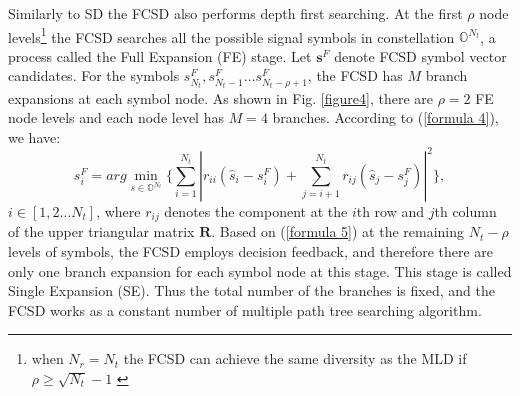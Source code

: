\documentclass[letterpaper, 10pt, conference,twoside]{ieeeconf}
\begin{document}
Similarly to SD the FCSD also performs depth first searching. At the first $\rho$ node levels\footnote{when $N_{r}=N_{t}$ the FCSD can achieve the same diversity as the MLD if $\rho\geq \sqrt{N_{t}}-1$ \cite{barbero2008fixing}} the FCSD searches all the possible signal symbols in constellation $\mathbb{O}^{N_{t}}$, a process called the Full Expansion (FE) stage. Let $\mathbf{s}^{F}$ denote FCSD symbol vector candidates. For the symbols $s^{F}_{N_{t}}, s^{F}_{N_{t}-1}\dots s^{F}_{N_{t}-\rho+1}$, the FCSD has $M$ branch expansions at each symbol node. As shown in Fig. \ref{figure4}, there are $\rho=2$ FE node levels and each node level has $M=4$ branches. According to (\ref{formula 4}), we have: 
\begin{equation}
s^{F}_{i}=arg\min_{s\in \mathbb{O}^{N_{t}}}\{\sum_{i=1}^{N_{t}}|r_{ii}(\hat{s}_{i}-s^{F}_{i})+\sum_{j=i+1}^{N_{t}}r_{ij}(\hat{s}_{j}-s^{F}_{j})|^{2}\},  \label{formula 5}
\end{equation} 
$i\in [1,2\dots N_{t}]$, where $r_{ij}$ denotes the component at the $i$th row and $j$th column of the upper triangular matrix $\mathbf{R}$. Based on (\ref{formula 5}) at the remaining $N_{t}-\rho$ levels of symbols, the FCSD employs decision feedback, and therefore there are only one branch expansion for each symbol node at this stage. This stage is called Single Expansion (SE). 
Thus the total number of the branches is fixed, and the FCSD works as a constant number of multiple path tree searching algorithm.
\end{document}
